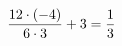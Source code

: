 \documentclass[preview]{standalone}
\begin{document}
\begin{align*}
\special{dvisvgm:raw <g id='unique000'>}\frac{12 \cdot (-4)}{6 \cdot 3} + 3 = \frac{1}{3}\special{dvisvgm:raw </g>}
\end{align*}
\end{document}
